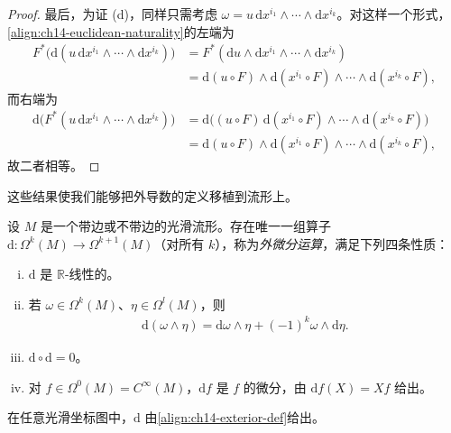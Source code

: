 \documentclass[../../main.tex]{subfiles}
\begin{document}
\begin{proof}
最后，为证 (d)，同样只需考虑 $\omega=u\,\mathrm{d}x^{i_1}\wedge\cdots\wedge\mathrm{d}x^{i_k}$。对这样一个形式，\eqref{align:ch14-euclidean-naturality}的左端为
\begin{align*}
F^*\bigl(\mathrm{d}(u\,\mathrm{d}x^{i_1}\wedge\cdots\wedge\mathrm{d}x^{i_k})\bigr)
&=F^*(\mathrm{d}u\wedge\mathrm{d}x^{i_1}\wedge\cdots\wedge\mathrm{d}x^{i_k})\\
&=\mathrm{d}(u\circ F)\wedge\mathrm{d}(x^{i_1}\circ F)\wedge\cdots\wedge\mathrm{d}(x^{i_k}\circ F),
\end{align*}
而右端为
\begin{align*}
\mathrm{d}\bigl(F^*(u\,\mathrm{d}x^{i_1}\wedge\cdots\wedge\mathrm{d}x^{i_k})\bigr)
&=\mathrm{d}\bigl((u\circ F)\,\mathrm{d}(x^{i_1}\circ F)\wedge\cdots\wedge\mathrm{d}(x^{i_k}\circ F)\bigr)\\
&=\mathrm{d}(u\circ F)\wedge\mathrm{d}(x^{i_1}\circ F)\wedge\cdots\wedge\mathrm{d}(x^{i_k}\circ F),
\end{align*}
故二者相等。
\end{proof}

这些结果使我们能够把外导数的定义移植到流形上。

\begin{theorem}[外微分运算的存在唯一性]\label{theorem:ch14-exterior-uniqueness}
设 $M$ 是一个带边或不带边的光滑流形。存在唯一一组算子 $\mathrm{d}:\Omega^k(M)\to\Omega^{k+1}(M)$（对所有 $k$），称为\emph{外微分运算}，满足下列四条性质：
\begin{enumerate}[(i)]
\item $\mathrm{d}$ 是 $\mathbb{R}$-线性的。
\item 若 $\omega\in\Omega^k(M)$、$\eta\in\Omega^l(M)$，则
\begin{align*}
\mathrm{d}(\omega\wedge\eta)=\mathrm{d}\omega\wedge\eta+(-1)^k\omega\wedge\mathrm{d}\eta.
\end{align*}
\item $\mathrm{d}\circ\mathrm{d}=0$。
\item 对 $f\in\Omega^0(M)=C^\infty(M)$，$\mathrm{d}f$ 是 $f$ 的微分，由 $\mathrm{d}f(X)=Xf$ 给出。
\end{enumerate}
在任意光滑坐标图中，$\mathrm{d}$ 由\eqref{align:ch14-exterior-def}给出。
\end{theorem}
\end{document}
